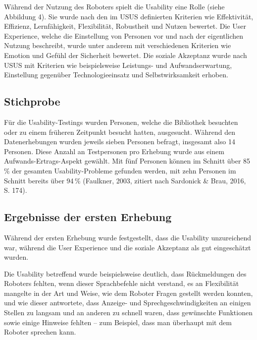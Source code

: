 \documentclass[a4paper,
fontsize=11pt,
oneside,
numbers=noperiodatend,
parskip=half-,
bibliography=totoc,
final
]{scrartcl}
\begin{document}
Während der Nutzung des Roboters spielt die Usability eine Rolle (siehe
Abbildung 4). Sie wurde nach den im USUS definierten Kriterien wie
Effektivität, Effizienz, Lernfähigkeit, Flexibilität, Robustheit und
Nutzen bewertet. Die User Experience, welche die Einstellung von
Personen vor und nach der eigentlichen Nutzung beschreibt, wurde unter
anderem mit verschiedenen Kriterien wie Emotion und Gefühl der
Sicherheit bewertet. Die soziale Akzeptanz wurde nach USUS mit Kriterien
wie beispielsweise Leistungs- und Aufwandserwartung, Einstellung
gegenüber Technologieeinsatz und Selbstwirksamkeit erhoben.

\hypertarget{stichprobe}{%
\subsection{Stichprobe}\label{stichprobe}}

Für die Usability-Testings wurden Personen, welche die Bibliothek
besuchten oder zu einem früheren Zeitpunkt besucht hatten, ausgesucht.
Während den Datenerhebungen wurden jeweils sieben Personen befragt,
insgesamt also 14 Personen. Diese Anzahl an Testpersonen pro Erhebung
wurde aus einem Aufwands-Ertrags-Aspekt gewählt. Mit fünf Personen
können im Schnitt über 85\,\% der gesamten Usability-Probleme gefunden
werden, mit zehn Personen im Schnitt bereits über 94\,\% (Faulkner, 2003,
zitiert nach Sardonick \& Brau, 2016, S. 174).

\hypertarget{ergebnisse-der-ersten-erhebung}{%
\subsection{Ergebnisse der ersten Erhebung}\label{ergebnisse-der-ersten-erhebung}}

Während der ersten Erhebung wurde festgestellt, dass die Usability
unzureichend war, während die User Experience und die soziale Akzeptanz
als gut eingeschätzt wurden.

Die Usability betreffend wurde beispielsweise deutlich, dass
Rückmeldungen des Roboters fehlten, wenn dieser Sprachbefehle nicht
verstand, es an Flexibilität mangelte in der Art und Weise, wie dem
Roboter Fragen gestellt werden konnten, und wie dieser antwortete, dass
Anzeige- und Sprechgeschwindigkeiten an einigen Stellen zu langsam und
an anderen zu schnell waren, dass gewünschte Funktionen sowie einige
Hinweise fehlten -- zum Beispiel, dass man überhaupt mit dem Roboter
sprechen kann.
\end{document}
